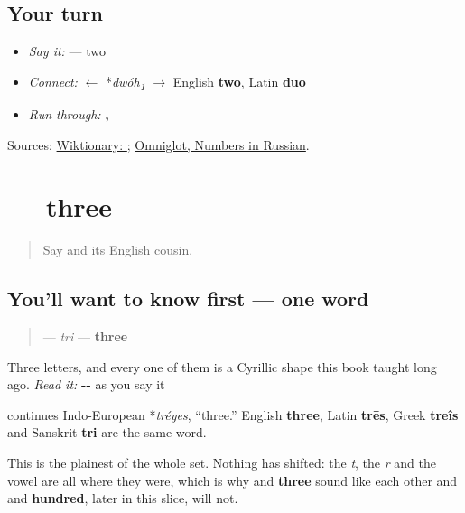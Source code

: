 \subsection*{Your turn}
\begin{itemize}
\raggedright
  \item \emph{Say it:} \textbf{} — two
  \item \emph{Connect:} \textbf{} $\leftarrow$ *\emph{dwóh\textsubscript{1}} $\to$ English \textbf{two}, Latin \textbf{duo}
  \item \emph{Run through:} \textbf{, }
\end{itemize}

\begin{tcolorbox}[breakable,colback=teal!4,colframe=teal!35!black,title={Before you move on}]
Sources: \href{https://en.wiktionary.org/wiki/\%D0\%B4\%D0\%B2\%D0\%B0}{Wiktionary: }; \href{https://www.omniglot.com/language/numbers/russian.htm}{Omniglot, Numbers in Russian}.
\end{tcolorbox}
\section[\texorpdfstring{\ru{три} (tri)}{три (tri)}]{ — three}

\label{lesson:RU-C23-tri}



\begin{quote}
Say \textbf{} and its English cousin.
\end{quote}

\subsection*{You'll want to know first — one word}
\begin{quote}
\textbf{} — \emph{tri} — \textbf{three}
\end{quote}

Three letters, and every one of them is a Cyrillic shape this book taught long ago. \emph{Read it:} \textbf{--} as you say it

\begin{cousinweb}
\textbf{} continues Indo-European *\emph{tréyes}, \textquotedblleft{}three.\textquotedblright{} English \textbf{three}, Latin \textbf{trēs}, Greek \textbf{treîs} and Sanskrit \textbf{tri} are the same word.

This is the plainest of the whole set. Nothing has shifted: the \emph{t}, the \emph{r} and the vowel are all where they were, which is why \textbf{} and \textbf{three} sound like each other and \textbf{} and \textbf{hundred}, later in this slice, will not.
\end{cousinweb}

